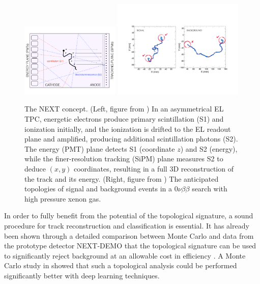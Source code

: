 \documentclass[11pt,a4paper]{article}
\begin{document}
\begin{figure}[!htb]
	\centering
	\includegraphics[width= 0.42\textwidth]{fig/nextEL.pdf}
	\includegraphics[width= 0.56\textwidth]{fig/TrackSignature.pdf}
	\caption{The NEXT concept. (Left, figure from \cite{Alvarez:2013gxa}) In an asymmetrical EL TPC, energetic electrons produce primary scintillation (S1) and ionization initially, and the ionization is drifted to the EL readout plane and amplified, producing additional scintillation photons (S2).  The energy (PMT) plane detects S1 (coordinate $z$) and S2 (energy), while the finer-resolution tracking (SiPM) plane measures S2 to deduce $(x,y)$ coordinates, resulting in a full 3D reconstruction of the track and its energy. (Right, figure from \cite{NEXT_sensitivity}) The anticipated topologies of signal and background events in a $0\nu\beta\beta$ search with high pressure xenon gas.} \label{fig.SS}
\end{figure}

In order to fully benefit from the potential of the topological signature, a sound procedure for track reconstruction and classification is essential. It has already been shown through a detailed comparison between Monte Carlo and data from the prototype detector NEXT-DEMO that the topological signature can be used to significantly reject background at an allowable cost in efficiency \cite{NEXT_topology}. A Monte Carlo study in \cite{NEXT_DNN} showed that such a topological analysis could be performed significantly better with deep learning techniques.
\end{document}
